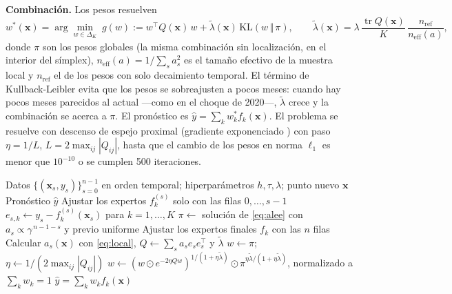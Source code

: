 \documentclass[11pt]{article}
\begin{document}
\textbf{Combinación.} Los pesos resuelven
\begin{equation}
w^*(\mathbf{x}) = \arg\min_{w\in\Delta_K}\; g(w) := w^\top Q(\mathbf{x})\,w + \tilde\lambda(\mathbf{x})\,\mathrm{KL}(w\,\Vert\,\pi),
\qquad \tilde\lambda(\mathbf{x}) = \lambda\,\frac{\operatorname{tr} Q(\mathbf{x})}{K}\,\frac{n_{\mathrm{ref}}}{n_{\mathrm{eff}}(a)},
\label{eq:alee}
\end{equation}
donde $\pi$ son los pesos globales (la misma combinación sin localización, en el interior del símplex), $n_{\mathrm{eff}}(a) = 1/\sum_s a_s^2$ es el tamaño efectivo de la muestra local \cite{kish1965} y $n_{\mathrm{ref}}$ el de los pesos con solo decaimiento temporal. El término de Kullback-Leibler evita que los pesos se sobreajusten a pocos meses: cuando hay pocos meses parecidos al actual ---como en el choque de 2020---, $\tilde\lambda$ crece y la combinación se acerca a $\pi$. El pronóstico es $\hat y = \sum_k w_k^* f_k(\mathbf{x})$. El problema se resuelve con descenso de espejo proximal (gradiente exponenciado \cite{kivinen1997}) con paso $\eta=1/L$, $L = 2\max_{ij}|Q_{ij}|$, hasta que el cambio de los pesos en norma $\ell_1$ es menor que $10^{-10}$ o se cumplen 500 iteraciones.

\begin{algorithm}[H]
\caption{ALEE: entrenamiento y pronóstico de un mes}
\label{alg:alee}
\begin{algorithmic}[1]
\Require Datos $\{(\mathbf{x}_s,y_s)\}_{s=0}^{n-1}$ en orden temporal; hiperparámetros $h,\tau,\lambda$; punto nuevo $\mathbf{x}$
\Ensure Pronóstico $\hat y$
 
  \State Ajustar los expertos $f_k^{(s)}$ solo con las filas $0,\dots,s-1$
  \State $e_{s,k}\gets y_s-f_k^{(s)}(\mathbf{x}_s)$ para $k=1,\dots,K$
\EndFor
\State $\pi\gets$ solución de \eqref{eq:alee} con $a_s\propto\gamma^{\,n-1-s}$ y previo uniforme 
\State Ajustar los expertos finales $f_k$ con las $n$ filas
\State Calcular $a_s(\mathbf{x})$ con \eqref{eq:local}, $Q\gets\sum_s a_s e_s e_s^\top$ y $\tilde\lambda$
\State $w\gets\pi$; $\eta\gets 1/(2\max_{ij}|Q_{ij}|)$
\Repeat {}
  \State $w\gets \left(w\odot e^{-2\eta Qw}\right)^{1/(1+\eta\tilde\lambda)}\odot\pi^{\eta\tilde\lambda/(1+\eta\tilde\lambda)}$, normalizado a $\sum_k w_k=1$
\State \Return $\hat y=\sum_k w_k f_k(\mathbf{x})$
\end{algorithmic}
\end{algorithm}
\end{document}
